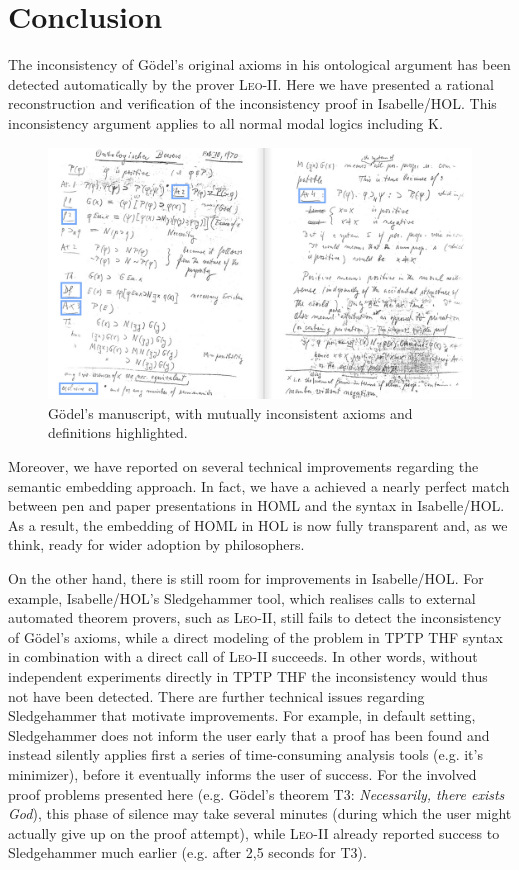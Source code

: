 \documentclass{article}
\begin{document}
\section{Conclusion}\label{sec:conclusion}
The inconsistency of G\"odel's original axioms in his ontological
argument has been detected automatically by the prover
\textsc{Leo-II}. Here we have presented a rational reconstruction and
verification of the inconsistency proof in Isabelle/HOL. This
inconsistency argument applies to all normal modal logics including K.
\begin{figure}
\centerline{\includegraphics[width=\textwidth]{./Images/Manuscript2.png}}
\caption{G\"{o}del's manuscript, with mutually inconsistent axioms and definitions highlighted.} \label{GoedelScript}
\end{figure}


Moreover, we have reported on several technical improvements regarding
the semantic embedding approach. In fact, we have a achieved a nearly
perfect match between pen and paper presentations in HOML and the
syntax in Isabelle/HOL. As a result, the embedding of HOML in
HOL is now fully transparent and, as we think, ready for wider adoption by
philosophers.

On the other hand, there is still room for improvements in
Isabelle/HOL. For example, Isabelle/HOL's Sledgehammer tool, which
realises calls to external automated theorem provers, such as
\textsc{Leo-II}, still fails to detect the inconsistency of G\"odel's
axioms, while a direct modeling of the problem in TPTP THF syntax in
combination with a direct call of \textsc{Leo-II} succeeds. In other
words, without independent experiments directly in TPTP THF the
inconsistency would thus not have been detected. There are further
technical issues regarding Sledgehammer that motivate
improvements. For example, in default setting, Sledgehammer does not
inform the user early that a proof has been found and instead silently
applies first a series of time-consuming analysis tools (e.g. it's
minimizer), before it eventually informs the user of success. For the
involved proof problems presented here (e.g. G\"odel's theorem T3:
\textit{Necessarily, there exists God}), this phase of silence may
take several minutes (during which the user might actually give up on
the proof attempt), while \textsc{Leo-II} already reported success to
Sledgehammer much earlier (e.g. after 2,5 seconds for T3).
\end{document}
